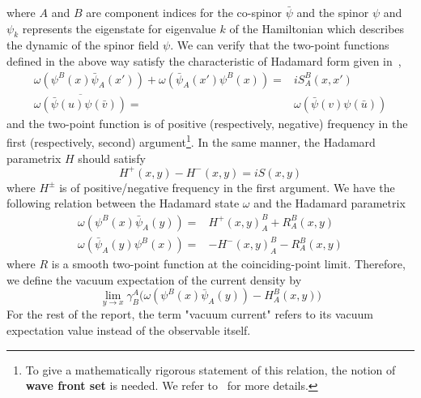where $A$ and $B$ are component indices for the co-spinor $\bar{\psi}$ and the spinor $\psi$ and $\psi_k$ represents the eigenstate for eigenvalue $k$ of the Hamiltonian which describes the dynamic of the spinor field $\psi$.
We can verify that the two-point functions defined in the above way satisfy the characteristic of Hadamard form given in~\cite{Radzikowski1996}, \ie
\begin{equation}\label{vacuum-hadamardcond}
\begin{split}
\omega(\psi^B(x)\bar{\psi}_A(x')) + \omega(\bar{\psi}_A(x')\psi^B(x)) = &
iS^B_A(x,x') \\
\overline{\omega(\bar{\psi}(u)\psi(\bar{v}))} = & \omega(\bar{\psi}(v)\psi(\bar{u}))
\end{split}
\end{equation}
and the two-point function is of positive (respectively, negative) frequency in the first (respectively, second) argument\footnote{
To give a mathematically rigorous statement of this relation, 
the notion of \textbf{wave front set} is needed. 
We refer to~\cite{Radzikowski1996} for more details.
}.
In the same manner, the Hadamard parametrix $H$ should satisfy
\begin{equation}\label{intro-hh}
H^+(x,y) - H^-(x,y) = i S(x,y)
\end{equation}
where $H^\pm$ is of positive/negative frequency in the first argument.
We have the following relation between the Hadamard state $\omega$ and the Hadamard parametrix
\begin{equation}\label{intro-renormalization}
\begin{split}
\omega(\psi^B(x)\bar{\psi}_A(y)) = & H^+(x,y)^B_A + R^B_A(x,y) \\
\omega(\bar{\psi}_A(y)\psi^B(x)) = &- H^-(x,y)^B_A - R^B_A(x,y)
\end{split}
\end{equation}
where $R$ is a smooth two-point function at the coinciding-point limit.
Therefore, 
we define the vacuum expectation of the current density by 
\begin{equation}\label{vacuum-currentexpression}
\lim_{y \rightarrow x} \gamma^A_B \big(
\omega(\psi^B(x)\bar{\psi}_A(y)) - H^B_A (x, y)\big)
\end{equation}
For the rest of the report, the term "vacuum current" refers to its vacuum expectation value instead of the observable itself. 
%
